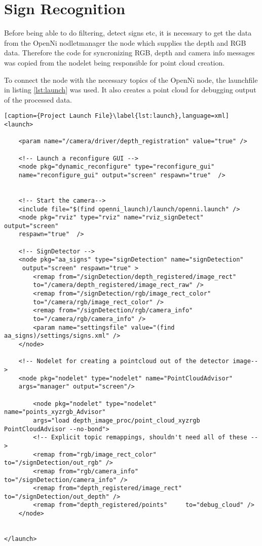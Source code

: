 \graphicspath{{./Software/img/}}
\chapter{Sign Recognition}
 
 Before being able to do filtering, detect signs etc, it is necessary to get the data from the OpenNi nodletmanager
 the node which supplies the depth and RGB data. Therefore the code for syncronizing RGB, 
 depth and camera info messages was copied from the nodelet being responsible 
 for point cloud creation. 
 
To connect the node with the necessary topics of the OpenNi node, the launchfile in listing \vref{lst:launch}
was used. It also creates a point cloud for debugging output of the processed data.

\begin{lstlisting}[caption={Project Launch File}\label{lst:launch},language=xml]
<launch>

	<param name="/camera/driver/depth_registration" value="true" />	

	<!-- Launch a reconfigure GUI -->
	<node pkg="dynamic_reconfigure" type="reconfigure_gui" 
	name="reconfigure_gui" output="screen" respawn="true"  />
	
	
	<!-- Start the camera-->
	<include file="$(find openni_launch)/launch/openni.launch" />
	<node pkg="rviz" type="rviz" name="rviz_signDetect" output="screen" 
	respawn="true"  />

	<!-- SignDetector -->
	<node pkg="aa_signs" type="signDetection" name="signDetection" 
	 output="screen" respawn="true" > 
 		<remap from="/signDetection/depth_registered/image_rect" 	
 		to="/camera/depth_registered/image_rect_raw" />
 		<remap from="/signDetection/rgb/image_rect_color" 			
 		to="/camera/rgb/image_rect_color" />
 		<remap from="/signDetection/rgb/camera_info" 				
 		to="/camera/rgb/camera_info" />
 		<param name="settingsfile" value="(find aa_signs)/settings/signs.xml" />
	</node>

  	<!-- Nodelet for creating a pointcloud out of the detector image-->
	<node pkg="nodelet" type="nodelet" name="PointCloudAdvisor" 
	args="manager" output="screen"/>

		<node pkg="nodelet" type="nodelet" name="points_xyzrgb_Advisor" 
		args="load depth_image_proc/point_cloud_xyzrgb PointCloudAdvisor --no-bond">
	    <!-- Explicit topic remappings, shouldn't need all of these -->
	    <remap from="rgb/image_rect_color"        to="/signDetection/out_rgb" />
	    <remap from="rgb/camera_info"             to="/signDetection/camera_info" />
	    <remap from="depth_registered/image_rect" to="/signDetection/out_depth" />
	    <remap from="depth_registered/points"     to="debug_cloud" />
  	</node>
  	
  	
</launch>
\end{lstlisting}

